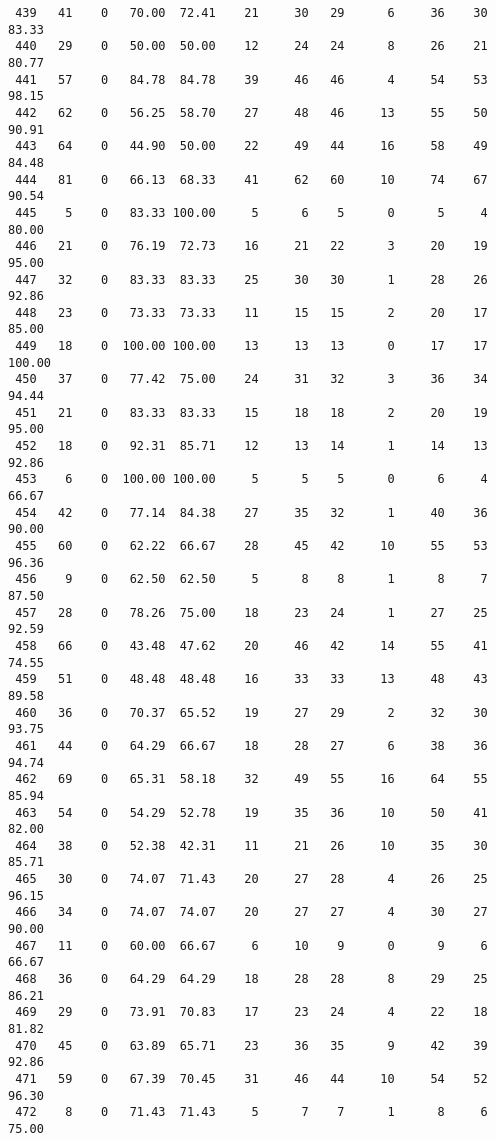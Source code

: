 \begin{verbatim}
 439   41    0   70.00  72.41    21     30   29      6     36    30    83.33
 440   29    0   50.00  50.00    12     24   24      8     26    21    80.77
 441   57    0   84.78  84.78    39     46   46      4     54    53    98.15
 442   62    0   56.25  58.70    27     48   46     13     55    50    90.91
 443   64    0   44.90  50.00    22     49   44     16     58    49    84.48
 444   81    0   66.13  68.33    41     62   60     10     74    67    90.54
 445    5    0   83.33 100.00     5      6    5      0      5     4    80.00
 446   21    0   76.19  72.73    16     21   22      3     20    19    95.00
 447   32    0   83.33  83.33    25     30   30      1     28    26    92.86
 448   23    0   73.33  73.33    11     15   15      2     20    17    85.00
 449   18    0  100.00 100.00    13     13   13      0     17    17   100.00
 450   37    0   77.42  75.00    24     31   32      3     36    34    94.44
 451   21    0   83.33  83.33    15     18   18      2     20    19    95.00
 452   18    0   92.31  85.71    12     13   14      1     14    13    92.86
 453    6    0  100.00 100.00     5      5    5      0      6     4    66.67
 454   42    0   77.14  84.38    27     35   32      1     40    36    90.00
 455   60    0   62.22  66.67    28     45   42     10     55    53    96.36
 456    9    0   62.50  62.50     5      8    8      1      8     7    87.50
 457   28    0   78.26  75.00    18     23   24      1     27    25    92.59
 458   66    0   43.48  47.62    20     46   42     14     55    41    74.55
 459   51    0   48.48  48.48    16     33   33     13     48    43    89.58
 460   36    0   70.37  65.52    19     27   29      2     32    30    93.75
 461   44    0   64.29  66.67    18     28   27      6     38    36    94.74
 462   69    0   65.31  58.18    32     49   55     16     64    55    85.94
 463   54    0   54.29  52.78    19     35   36     10     50    41    82.00
 464   38    0   52.38  42.31    11     21   26     10     35    30    85.71
 465   30    0   74.07  71.43    20     27   28      4     26    25    96.15
 466   34    0   74.07  74.07    20     27   27      4     30    27    90.00
 467   11    0   60.00  66.67     6     10    9      0      9     6    66.67
 468   36    0   64.29  64.29    18     28   28      8     29    25    86.21
 469   29    0   73.91  70.83    17     23   24      4     22    18    81.82
 470   45    0   63.89  65.71    23     36   35      9     42    39    92.86
 471   59    0   67.39  70.45    31     46   44     10     54    52    96.30
 472    8    0   71.43  71.43     5      7    7      1      8     6    75.00

\end{verbatim}
